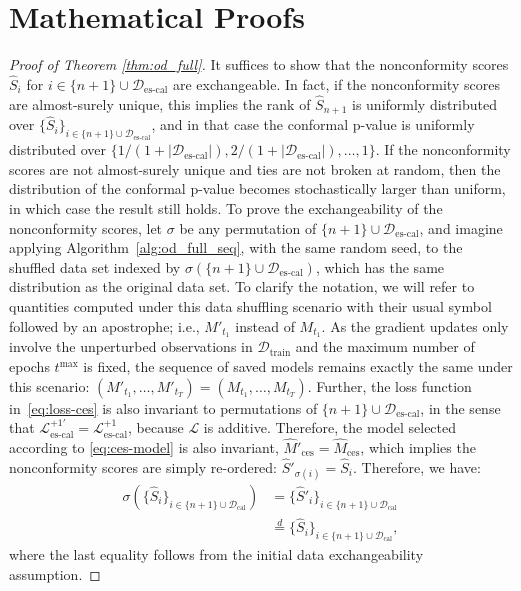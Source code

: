 \clearpage

\section{Mathematical Proofs} \label{appendix:proofs}

\begin{proof}[Proof of Theorem \ref{thm:od_full}]
It suffices to show that the nonconformity scores $\hat{S}_i$ for $i \in \{n+1\}\cup \mathcal{D}_{\text{es-cal}}$ are exchangeable. In fact, if the nonconformity scores are almost-surely unique, this implies the rank of $\hat{S}_{n+1}$ is uniformly distributed over $\{\hat{S}_{i}\}_{i \in \{n+1\}\cup \mathcal{D}_{\text{es-cal}}}$, and in that case the conformal p-value is uniformly distributed over $\{ 1/(1+|\mathcal{D}_{\text{es-cal}}|), 2/(1+|\mathcal{D}_{\text{es-cal}}|), \dots, 1\}$. If the nonconformity scores are not almost-surely unique and ties are not broken at random, then the distribution of the conformal p-value becomes stochastically larger than uniform, in which case the result still holds.
To prove the exchangeability of the nonconformity scores, let $\sigma$ be any permutation of $\{n+1\}\cup \mathcal{D}_{\text{es-cal}}$, and imagine applying Algorithm~\ref{alg:od_full_seq}, with the same random seed, to the shuffled data set indexed by $\sigma(\{n+1\}\cup \mathcal{D}_{\text{es-cal}})$, which has the same distribution as the original data set. To clarify the notation, we will refer to quantities computed under this data shuffling scenario with their usual symbol followed by an apostrophe; i.e., $M'_{t_1}$ instead of $M_{t_1}$.
As the gradient updates only involve the unperturbed observations in $\mathcal{D}_{\text{train}}$ and the maximum number of epochs $t^{\text{max}}$ is fixed, the sequence of saved models remains exactly the same under this scenario: $(M'_{t_1} , \dots, M'_{t_T}) = (M_{t_1} , \dots, M_{t_T})$.
Further, the loss function in~\eqref{eq:loss-ces} is also invariant to permutations of $\{n+1\}\cup \mathcal{D}_{\text{es-cal}}$, in the sense that $\mathcal{L}_{\text{es-cal}}^{+1'} = \mathcal{L}_{\text{es-cal}}^{+1}$, because $\mathcal{L}$ is additive.
Therefore, the model selected according to \eqref{eq:ces-model} is also invariant, $\hat{M}'_{\text{ces}} = \hat{M}_{\text{ces}}$, which implies the nonconformity scores are simply re-ordered: $\hat{S}'_{\sigma(i)} = \hat{S}_{i}$.
Therefore, we have:
\begin{align*}
  \sigma(\{\hat{S}_i\}_{i \in \{n+1\}\cup \mathcal{D}_{\text{cal}}})
  &= \{\hat{S}'_i\}_{i \in \{n+1\}\cup \mathcal{D}_{\text{cal}}} \\
  & \overset{d}{=} \{\hat{S}_i\}_{i \in \{n+1\}\cup \mathcal{D}_{\text{cal}}},
\end{align*}
where the last equality follows from the initial data exchangeability assumption.
\end{proof}

